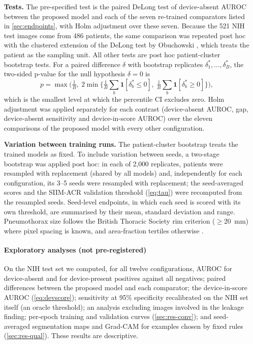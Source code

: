 \documentclass{ieeeaccess}
\begin{document}
\textbf{Tests.} The pre-specified test is the paired DeLong test of device-absent AUROC between the proposed model and each of the seven re-trained comparators listed in \cref{sec:endpoints}, with Holm adjustment over these seven. Because the 521 NIH test images come from 486 patients, the same comparison was repeated post hoc with the clustered extension of the DeLong test by Obuchowski \cite{obuchowski1997clustered}, which treats the patient as the sampling unit. All other tests are post hoc patient-cluster bootstrap tests. For a paired difference $\delta$ with bootstrap replicates $\delta^{*}_1,\dots,\delta^{*}_B$, the two-sided p-value for the null hypothesis $\delta=0$ is
\begin{equation}
p = \max\!\Big(\tfrac{1}{B},\; 2\min\big\{\tfrac{1}{B}\textstyle\sum_b \mathbf{1}[\delta^{*}_b\le 0],\; \tfrac{1}{B}\textstyle\sum_b \mathbf{1}[\delta^{*}_b\ge 0]\big\}\Big),
\label{eq:pboot}
\end{equation}
which is the smallest level at which the percentile CI excludes zero. Holm adjustment was applied separately for each contrast (device-absent AUROC, gap, device-absent sensitivity and device-in-score AUROC) over the eleven comparisons of the proposed model with every other configuration.

\textbf{Variation between training runs.} The patient-cluster bootstrap treats the trained models as fixed. To include variation between seeds, a two-stage bootstrap \cite{ren2010hierboot} was applied post hoc: in each of 2{,}000 replicates, patients were resampled with replacement (shared by all models) and, independently for each configuration, its 3--5 seeds were resampled with replacement; the seed-averaged scores and the SIIM-ACR validation threshold (\cref{eq:tau}) were recomputed from the resampled seeds. Seed-level endpoints, in which each seed is scored with its own threshold, are summarised by their mean, standard deviation and range. Pneumothorax size follows the British Thoracic Society rim criterion ($\ge$20~mm) where pixel spacing is known, and area-fraction tertiles otherwise \cite{macduff2010bts}.

\paragraph{Exploratory analyses (not pre-registered)} On the NIH test set we computed, for all twelve configurations, AUROC for device-absent and for device-present positives against all negatives; paired differences between the proposed model and each comparator; the device-in-score AUROC (\cref{eq:devscore}); sensitivity at 95\% specificity recalibrated on the NIH set itself (an oracle threshold); an analysis excluding images involved in the leakage finding; per-epoch training and validation curves (\cref{sec:res-conv}); and seed-averaged segmentation maps and Grad-CAM \cite{selvaraju2020gradcam} for examples chosen by fixed rules (\cref{sec:res-qual}). These results are descriptive.
\end{document}
